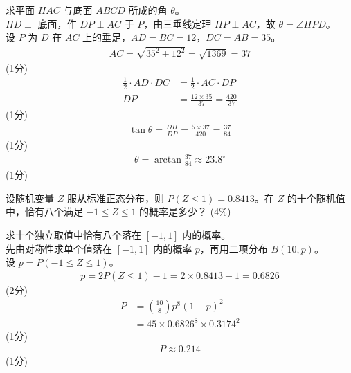 \begin{solution}
    求平面 $HAC$ 与底面 $ABCD$ 所成的角 $\theta$。\\
    $HD\perp$ 底面，作 $DP\perp AC$ 于 $P$，由三垂线定理 $HP\perp AC$，故 $\theta=\angle HPD$。\\
    设 $P$ 为 $D$ 在 $AC$ 上的垂足，$AD=BC=12$，$DC=AB=35$。\\
    \begin{align*}
        AC=\sqrt{35^2+12^2}=\sqrt{1369}=37
    \end{align*}
    \hfill (1分) \\
    \begin{align*}
        \frac12\cdot AD\cdot DC &=\frac12\cdot AC\cdot DP \\
        DP &=\frac{12\times35}{37}=\frac{420}{37}
    \end{align*}
    \hfill (1分) \\
    \begin{align*}
        \tan\theta=\frac{DH}{DP}=\frac{5\times37}{420}=\frac{37}{84}
    \end{align*}
    \hfill (1分) \\
    \begin{align*}
        \theta=\arctan\frac{37}{84}\approx 23.8^\circ
    \end{align*}
    \hfill (1分)
\end{solution}

\begin{question}[points = 4]
    设随机变量 $Z$ 服从标准正态分布，则 $P(Z\le1)=0.8413$。在 $Z$ 的十个随机值中，恰有八个满足 $-1\le Z\le1$ 的概率是多少？
    \hfill (4\%)
\end{question}

\begin{solution}
    求十个独立取值中恰有八个落在 $[-1,1]$ 内的概率。\\
    先由对称性求单个值落在 $[-1,1]$ 内的概率 $p$，再用二项分布 $B(10,p)$。\\
    设 $p=P(-1\le Z\le1)$。\\
    \begin{align*}
        p=2P(Z\le1)-1=2\times0.8413-1=0.6826
    \end{align*}
    \hfill (2分) \\
    \begin{align*}
        P &=\binom{10}{8}p^8(1-p)^2 \\
        &=45\times0.6826^8\times0.3174^2
    \end{align*}
    \hfill (1分) \\
    \begin{align*}
        P\approx0.214
    \end{align*}
    \hfill (1分)
\end{solution}

